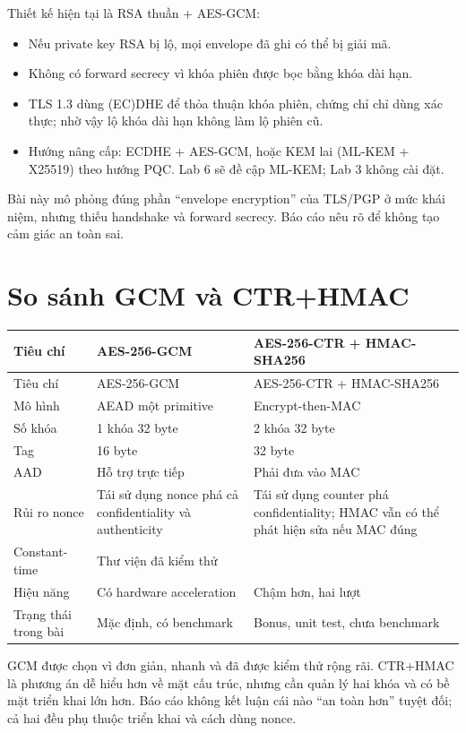 \documentclass[12pt,a4paper,oneside]{report}
\let\origtexttt\texttt
\renewcommand{\texttt}[1]{\origtexttt{\seqsplit{#1}}}
\begin{document}
Thiết kế hiện tại là RSA thuần + AES-GCM:


\begin{itemize}[leftmargin=*]
\item Nếu private key RSA bị lộ, mọi envelope đã ghi có thể bị giải mã.
\item Không có forward secrecy vì khóa phiên được bọc bằng khóa dài hạn.
\item TLS 1.3 dùng (EC)DHE để thỏa thuận khóa phiên, chứng chỉ chỉ dùng xác thực; nhờ vậy lộ khóa dài hạn không làm lộ phiên cũ.
\item Hướng nâng cấp: ECDHE + AES-GCM, hoặc KEM lai (ML-KEM + X25519) theo hướng PQC. Lab 6 sẽ đề cập ML-KEM; Lab 3 không cài đặt.
\end{itemize}


Bài này mô phỏng đúng phần “envelope encryption” của TLS/PGP ở mức khái niệm, nhưng thiếu handshake và forward secrecy. Báo cáo nêu rõ để không tạo cảm giác an toàn sai.


\section{So sánh GCM và CTR+HMAC}


\begin{longtable}{p{}p{}p{}}
\toprule
Tiêu chí & AES-256-GCM & AES-256-CTR + HMAC-SHA256 \\
\midrule
\endfirsthead
\toprule
Tiêu chí & AES-256-GCM & AES-256-CTR + HMAC-SHA256 \\
\midrule
\endhead
Mô hình & AEAD một primitive & Encrypt-then-MAC \\
Số khóa & 1 khóa 32 byte & 2 khóa 32 byte \\
Tag & 16 byte & 32 byte \\
AAD & Hỗ trợ trực tiếp & Phải đưa vào MAC \\
Rủi ro nonce & Tái sử dụng nonce phá cả confidentiality và authenticity & Tái sử dụng counter phá confidentiality; HMAC vẫn có thể phát hiện sửa nếu MAC đúng \\
Constant-time & Thư viện đã kiểm thử & \texttt{CRYPTO\_memcmp} \\
Hiệu năng & Có hardware acceleration & Chậm hơn, hai lượt \\
Trạng thái trong bài & Mặc định, có benchmark & Bonus, unit test, chưa benchmark \\
\bottomrule
\end{longtable}


GCM được chọn vì đơn giản, nhanh và đã được kiểm thử rộng rãi. CTR+HMAC là phương án dễ hiểu hơn về mặt cấu trúc, nhưng cần quản lý hai khóa và có bề mặt triển khai lớn hơn. Báo cáo không kết luận cái nào “an toàn hơn” tuyệt đối; cả hai đều phụ thuộc triển khai và cách dùng nonce.
\end{document}
